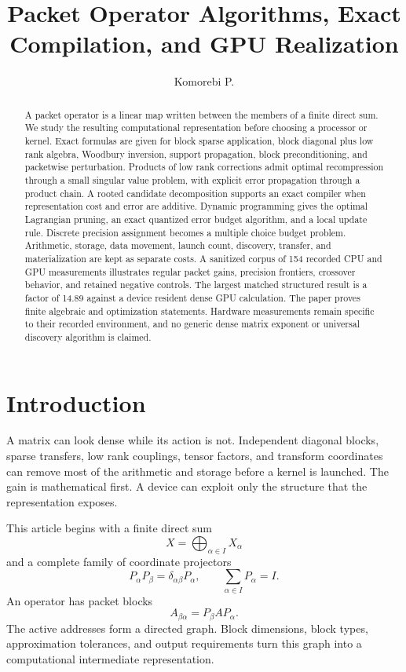 \documentclass{aomart}
\title[Packet operator algorithms]{Packet Operator Algorithms, Exact Compilation, and GPU Realization}
\author[Komorebi P.]{Komorebi P.}
\theoremstyle{definition}
\theoremstyle{remark}
\begin{document}
\begin{abstract}
A packet operator is a linear map written between the members of a finite direct sum. We study the resulting computational representation before choosing a processor or kernel. Exact formulas are given for block sparse application, block diagonal plus low rank algebra, Woodbury inversion, support propagation, block preconditioning, and packetwise perturbation. Products of low rank corrections admit optimal recompression through a small singular value problem, with explicit error propagation through a product chain. A rooted candidate decomposition supports an exact compiler when representation cost and error are additive. Dynamic programming gives the optimal Lagrangian pruning, an exact quantized error budget algorithm, and a local update rule. Discrete precision assignment becomes a multiple choice budget problem. Arithmetic, storage, data movement, launch count, discovery, transfer, and materialization are kept as separate costs. A sanitized corpus of 154 recorded CPU and GPU measurements illustrates regular packet gains, precision frontiers, crossover behavior, and retained negative controls. The largest matched structured result is a factor of 14.89 against a device resident dense GPU calculation. The paper proves finite algebraic and optimization statements. Hardware measurements remain specific to their recorded environment, and no generic dense matrix exponent or universal discovery algorithm is claimed.
\end{abstract}
\maketitle
\thispagestyle{plain}

\section{Introduction}\label{sec:introduction}

A matrix can look dense while its action is not. Independent diagonal blocks, sparse transfers, low rank couplings, tensor factors, and transform coordinates can remove most of the arithmetic and storage before a kernel is launched. The gain is mathematical first. A device can exploit only the structure that the representation exposes.

This article begins with a finite direct sum
\[
X=\bigoplus_{\alpha\in I}X_\alpha
\]
and a complete family of coordinate projectors
\[
P_\alpha P_\beta=\delta_{\alpha\beta}P_\alpha,
\qquad
\sum_{\alpha\in I}P_\alpha=I.
\]
An operator has packet blocks
\[
A_{\beta\alpha}=P_\beta AP_\alpha.
\]
The active addresses form a directed graph. Block dimensions, block types, approximation tolerances, and output requirements turn this graph into a computational intermediate representation.
\end{document}
